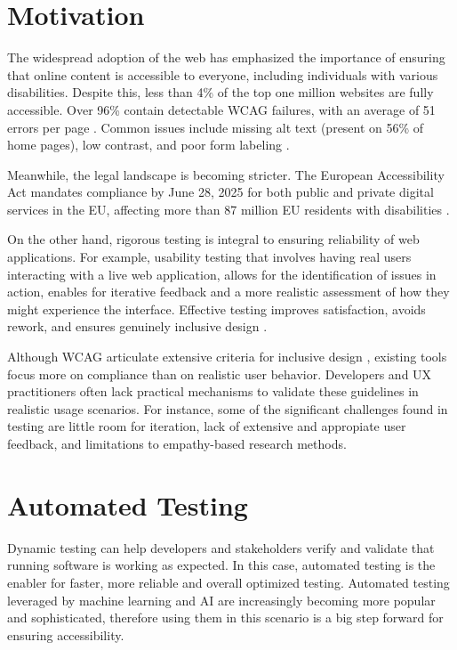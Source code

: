 
\section{Motivation}

The widespread adoption of the web has emphasized the importance of ensuring that online content is accessible to everyone, including individuals with various disabilities\cite{abu2023web}. Despite this, less than 4\% of the top one million websites are fully accessible. Over 96\% contain detectable \ac{WCAG} failures, with an average of 51 errors per page \cite{webaimmillion2025}. Common issues include missing alt text (present on 56\% of home pages), low contrast, and poor form labeling \cite{audioeye2024}.

Meanwhile, the legal landscape is becoming stricter. The European Accessibility Act mandates compliance by June 28, 2025 for both public and private digital services in the EU, affecting more than 87 million EU residents with disabilities \cite{audioeyeEAA2025, accessibleEU2025}. %

On the other hand, rigorous testing is integral to ensuring reliability of web applications. For example, usability testing that involves having real users interacting with a live web application, allows for the identification of issues in action, enables for iterative feedback and a more realistic assessment of how they might experience the interface. Effective testing improves satisfaction, avoids rework, and ensures genuinely inclusive design \cite{accessdesign2025}.

Although \ac{WCAG} articulate extensive criteria for inclusive design \cite{w3c_WCAG22}, existing tools focus more on compliance than on realistic user behavior. Developers and UX practitioners often lack practical mechanisms to validate these guidelines in realistic usage scenarios. For instance, some of the significant challenges found in testing are little room for iteration, lack of extensive and appropiate user feedback, and limitations to empathy-based research methods\cite{lu2025uxagent}.


\section{Automated Testing}

Dynamic testing can help developers and stakeholders verify and validate that running software is working as expected. In this case, automated testing is the enabler for faster, more reliable and overall optimized testing. Automated testing leveraged by machine learning and \ac{AI} are increasingly becoming more popular and sophisticated, therefore using them in this scenario is a big step forward for ensuring accessibility. %

